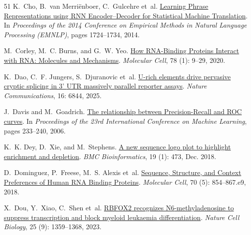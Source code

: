 \begin{thebibliography}{51}
K.~Cho, B.~van Merri{\"e}nboer, C.~Gulcehre et~al.
\newblock \href{https://doi.org/10.3115/v1/D14-1179}{Learning Phrase
  Representations using RNN Encoder--Decoder for Statistical Machine
  Translation}.
\newblock In \emph{Proceedings of the 2014 Conference on Empirical Methods in
  Natural Language Processing (EMNLP)}, pages 1724--1734, 2014.

M.~Corley, M.~C. Burns, and G.~W. Yeo.
\newblock \href{https://doi.org/10.1016/j.molcel.2020.03.011}{How {RNA}-Binding
  Proteins Interact with {RNA}: Molecules and Mechanisms}.
\newblock \emph{Molecular Cell}, 78 (1): 9--29, 2020.

K.~Dao, C.~F. Jungers, S.~Djuranovic et~al.
\newblock \href{https://doi.org/10.1038/s41467-025-62000-9}{U-rich elements
  drive pervasive cryptic splicing in 3' {UTR} massively parallel reporter
  assays}.
\newblock \emph{Nature Communications}, 16: 6844, 2025.

J.~Davis and M.~Goadrich.
\newblock \href{https://doi.org/10.1145/1143844.1143874}{The relationship
  between Precision-Recall and ROC curves}.
\newblock In \emph{Proceedings of the 23rd International Conference on Machine
  Learning}, pages 233--240, 2006.

K.~K. Dey, D.~Xie, and M.~Stephens.
\newblock \href{https://doi.org/10.1186/s12859-018-2489-3}{A new sequence logo
  plot to highlight enrichment and depletion}.
\newblock \emph{BMC Bioinformatics}, 19 (1): 473, Dec. 2018.

D.~Dominguez, P.~Freese, M.~S. Alexis et~al.
\newblock \href{https://doi.org/10.1016/j.molcel.2018.05.001}{Sequence,
  Structure, and Context Preferences of Human RNA Binding Proteins}.
\newblock \emph{Molecular Cell}, 70 (5): 854--867.e9, 2018.

X.~Dou, Y.~Xiao, C.~Shen et~al.
\newblock \href{https://doi.org/10.1038/s41556-023-01213-w}{{RBFOX2} recognizes
  {N6}-methyladenosine to suppress transcription and block myeloid leukaemia
  differentiation}.
\newblock \emph{Nature Cell Biology}, 25 (9): 1359--1368,
  2023.


\end{thebibliography}
